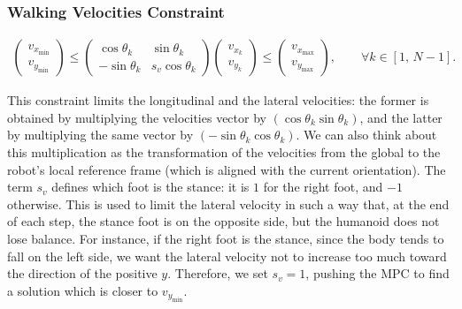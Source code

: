 \subsubsection{Walking Velocities Constraint}
\begin{align}
    \begin{pmatrix}
        v_{x_{\min}} \\[1ex]
        v_{y_{\min}}
    \end{pmatrix}
    \le
    \begin{pmatrix}
        \cos\theta_{k} & \sin\theta_{k} \\[1ex]
        -\sin\theta_{k} & s_{v}\cos\theta_{k}
    \end{pmatrix}
    \begin{pmatrix}
        v_{x_{k}} \\[1ex]
        v_{y_{k}}
    \end{pmatrix}
    \le
    \begin{pmatrix}
        v_{x_{\max}} \\[1ex]
        v_{y_{\max}}
    \end{pmatrix}
    , \qquad \forall k \in \left[ 1,\, N-1\right].
\end{align}

This constraint limits the longitudinal and the lateral velocities: the former is obtained by multiplying the velocities vector by $\left(\cos{\theta_k} \sin{\theta_k}\right)$, and the latter by multiplying the same vector by $\left(-\sin{\theta_k} \cos{\theta_k}\right)$.
We can also think about this multiplication as the transformation of the velocities from the global to the robot's local reference frame (which is aligned with the current orientation).
The term $s_v$ defines which foot is the stance: it is $1$ for the right foot, and $-1$ otherwise. This is used to limit the lateral velocity in such a way that, at the end of each step, the stance foot is on the opposite side, but the humanoid does not lose balance.
For instance, if the right foot is the stance, since the body tends to fall on the left side, we want the lateral velocity not to increase too much toward the direction of the positive $y$. Therefore, we set $s_v=1$, pushing the MPC to find a solution which is closer to $v_{y_{\min}}$.


